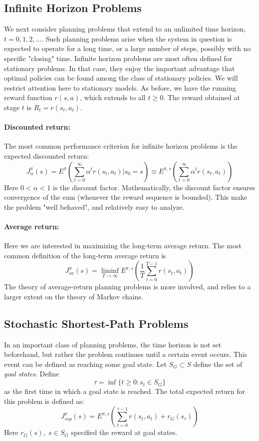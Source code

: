 \subsection{Infinite Horizon Problems}
We next consider planning problems that extend to an unlimited time horizon, $t = 0,1,2, \ldots $. Such planning problems arise when the system in question is expected to operate for a long time, or a large number of steps, possibly with no specific "closing" time.
Infinite horizon problems are most often defined for stationary problems. In that case, they enjoy the important advantage that optimal policies can be found among the class of stationary policies.  We will restrict attention here to stationary models.
As before, we have the running reward function $r(s,a)$, which extends to all $t \ge 0$. The reward obtained at stage $t$ is  ${R_t} = r({s_t},{a_t})$.

\paragraph{Discounted return:} The most common performance criterion for infinite horizon problems is the expected discounted return:
\[J_\alpha ^\pi (s) = {E^\pi }\left(\sum\limits_{t = 0}^\infty  {{\alpha ^t}r({s_t},{a_t})} |{s_0} = s\right) \equiv {E^{\pi ,s}}\left(\sum\limits_{t = 0}^\infty  {{\alpha ^t}r({s_t},{a_t})} \right)\]
Here $0 < \alpha  < 1$ is the discount factor. Mathematically, the discount factor ensures convergence of the sum (whenever the reward sequence is bounded). This make the problem "well behaved", and relatively easy to analyze.
\paragraph{Average return:}  Here we are interested in maximizing the long-term average return. The most common definition of the long-term average return is
\[J_{av}^\pi (s) = \mathop {\lim \inf }\limits_{T \to \infty } {E^{\pi ,s}}\left(\frac{1}{T}\sum\limits_{t = 0}^{T - 1} {r({s_t},{a_t})} \right)\]
The theory of average-return planning problems is more involved, and relies to a larger extent on the theory of Markov chains.


\subsection{Stochastic Shortest-Path Problems}
In an important class of planning problems, the time horizon is not set beforehand, but rather the problem continues until a certain event occurs. This event can be defined as reaching some goal state.
Let  ${S_G} \subset S$ define the set of \emph{goal states}. Define
\[\tau  = \inf \{ t \ge 0:{s_t} \in {S_G}\} \]
as the first time in which a goal state is reached. The total expected return for this problem is defined as:
\[J_{ssp}^\pi (s) = {E^{\pi ,s}}\left(\sum\limits_{t = 0}^{\tau  - 1} {r({s_t},{a_t})}  + {r_G}({s_\tau })\right)\]
Here ${r_G}(s),\;s \in {S_G}$ specified the reward at goal states.


